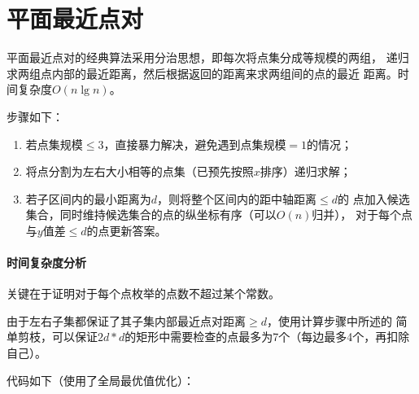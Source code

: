 \section{平面最近点对}
平面最近点对的经典算法采用分治思想，即每次将点集分成等规模的两组，
递归求两组点内部的最近距离，然后根据返回的距离来求两组间的点的最近
距离。时间复杂度$O(n\lg n)$。

步骤如下：
\begin{enumerate}
    \item 若点集规模$\leq 3$，直接暴力解决，避免遇到点集规模$=1$的情况；
    \item 将点分割为左右大小相等的点集（已预先按照$x$排序）递归求解；
    \item 若子区间内的最小距离为$d$，则将整个区间内的距中轴距离$\leq d$的
    点加入候选集合，同时维持候选集合的点的纵坐标有序（可以$O(n)$归并），
    对于每个点与$y$值差$\leq d$的点更新答案。
\end{enumerate}

\paragraph{时间复杂度分析}
关键在于证明对于每个点枚举的点数不超过某个常数。

由于左右子集都保证了其子集内部最近点对距离$\geq d$，使用计算步骤中所述的
简单剪枝，可以保证$2d*d$的矩形中需要检查的点最多为7个（每边最多4个，再扣除自己）。

代码如下（使用了全局最优值优化）：

